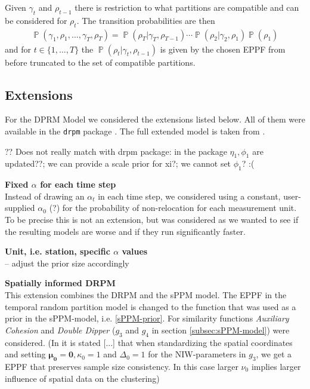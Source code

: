 \documentclass[12pt,a4paper]{article}
\newcommand{\drpm}{\texttt{drpm}}
\DeclareMathOperator{\PP}{\mathbb{P}}
\begin{document}
Given $\gamma_t$ and $\rho_{t-1}$ there is restriction to what partitions are compatible and can be considered for $\rho_{t}$. The transition probabilities are then
\begin{align*}
    \PP(\gamma_1, \rho_1, \ldots, \gamma_T, \rho_T) = \PP(\rho_T\vert \gamma_T, \rho_{T-1})  \cdots  \PP(\rho_2\vert \gamma_2, \rho_{1}) \PP(\rho_1)
\end{align*}
and for $t \in \{1, \dots, T \}$ the $\PP(\rho_t\vert \gamma_t, \rho_{t-1})$ is given by the chosen EPPF from before truncated to the set of compatible partitions.

\subsection{Extensions}
\label{subsec:DRPMExtensions}

For the DPRM Model we considered the extensions listed below. All of them were available in the \drpm{} package \cite{drpm}. The full extended model is taken from \cite[Section 4]{Page2021-Temporal}. \medskip

?? Does not really match with drpm package: in the package $\eta_1, \phi_1$ are updated??; we can provide a scale prior for xi?; we cannot set $\phi_1$? :(

\textbf{Fixed $\alpha$ for each time step}\\
Instead of drawing an $\alpha_t$ in each time step, we considered using a constant, user-supplied $\alpha_0$ (?) for the probability of non-relocation for each measurement unit. To be precise this is not an extension, but was considered as we wanted to see if the resulting models are worse and if they run significantly faster. \medskip

\textbf{Unit, i.e. station, specific $\alpha$ values}\\ -- adjust the prior size accordingly \medskip


\textbf{Spatially informed DRPM}\\
This extension combines the DRPM and the sPPM model. The EPPF in the temporal random partition model is changed to the function that was used as a prior in the sPPM-model, i.e. \ref{sPPM-prior}. For similarity functions \textit{Auxiliary Cohesion} and \textit{Double Dipper} ($g_3$ and $g_4$ in section \ref{subsec:sPPM-model}) were considered. (In \cite[Section 4.1]{Page2021-Temporal} it is stated [...] that when standardizing the spatial coordinates and setting $\mathbf{\mu_0} = \mathbf{0}, \kappa_0 = 1$ and $\Delta_0 = 1$ for the NIW-parameters in $g_3$, we get a EPPF that preserves sample size consistency. In this case larger $\nu_0$ implies larger influence of spatial data on the clustering) \medskip
\end{document}

